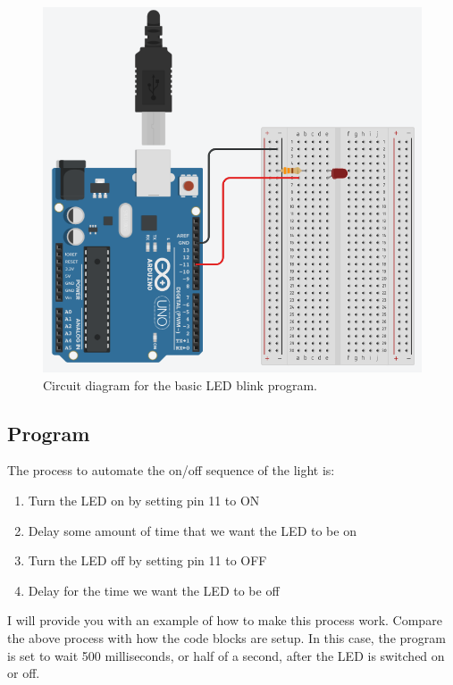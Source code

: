 \documentclass[12pt]{article}
\begin{document}
	\begin{figure}[H]
		\begin{center}
			\includegraphics[scale=0.5]{blink_circuit}
			\caption{Circuit diagram for the basic LED blink program.}
			\label{fig:circuit_blink}
		\end{center}
	\end{figure}

	\subsection{Program}
	
	The process to automate the on/off sequence of the light is:
	
	\begin{enumerate}
		\itemsep -1em
		\item Turn the LED on by setting pin 11 to ON
		\item Delay some amount of time that we want the LED to be on
		\item Turn the LED off by setting pin 11 to OFF
		\item Delay for the time we want the LED to be off
	\end{enumerate}

	I will provide you with an example of how to make this process work. Compare the above process with how the code blocks are setup. In this case, the program is set to wait 500 milliseconds, or half of a second, after the LED is switched on or off.
	
\end{document}
